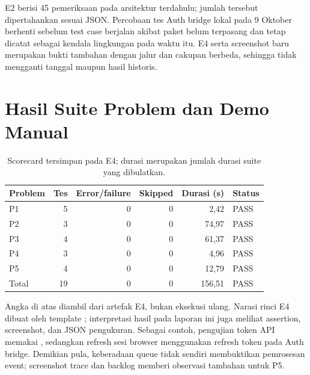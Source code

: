 E2 berisi 45 pemeriksaan pada arsitektur terdahulu; jumlah tersebut dipertahankan sesuai JSON. Percobaan tes Auth bridge lokal pada 9 Oktober berhenti sebelum test case berjalan akibat paket  belum terpasang dan tetap dicatat sebagai kendala lingkungan pada waktu itu. E4 serta screenshot baru merupakan bukti tambahan dengan jalur dan cakupan berbeda, sehingga tidak mengganti tanggal maupun hasil historis.

\section{Hasil Suite Problem dan Demo Manual}
\begin{table}[H]\small
\centering
\begin{tabular}{@{}lrrrrl@{}}
\toprule \textbf{Problem} & \textbf{Tes} & \textbf{Error/failure} & \textbf{Skipped} & \textbf{Durasi (s)} & \textbf{Status}\\\midrule
P1 & 5 & 0 & 0 & 2,42 & PASS\\
P2 & 3 & 0 & 0 & 74,97 & PASS\\
P3 & 4 & 0 & 0 & 61,37 & PASS\\
P4 & 3 & 0 & 0 & 4,96 & PASS\\
P5 & 4 & 0 & 0 & 12,79 & PASS\\\midrule
Total & 19 & 0 & 0 & 156,51 & PASS\\\bottomrule
\end{tabular}
\caption{Scorecard tersimpan pada E4; durasi merupakan jumlah durasi suite yang dibulatkan.}
\end{table}

Angka di atas diambil dari artefak E4, bukan eksekusi ulang. Narasi rinci E4 dibuat oleh template ; interpretasi hasil pada laporan ini juga melihat assertion, screenshot, dan JSON pengukuran. Sebagai contoh, pengujian token API memakai , sedangkan refresh sesi browser menggunakan refresh token pada Auth bridge. Demikian pula, keberadaan queue tidak sendiri membuktikan pemrosesan event; screenshot trace dan backlog memberi observasi tambahan untuk P5.

